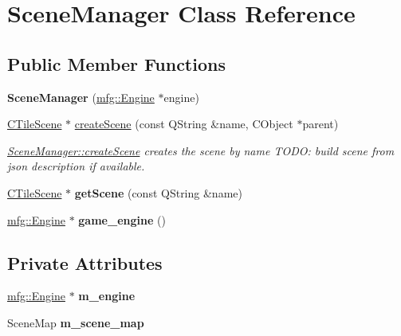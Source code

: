 \hypertarget{class_scene_manager}{}\section{Scene\+Manager Class Reference}
\label{class_scene_manager}
\subsection*{Public Member Functions}
\begin{DoxyCompactItemize}
\item 
\mbox{\label{class_scene_manager_a017968ad7fea883b37597ccd43ee8d21}} 
{\bfseries Scene\+Manager} (\hyperlink{classmfg_1_1_engine}{mfg\+::\+Engine} $\ast$engine)
\item 
\hyperlink{class_c_tile_scene}{C\+Tile\+Scene} $\ast$ \hyperlink{class_scene_manager_a0da379e114fea306e72feab6acc358ca}{create\+Scene} (const Q\+String \&name, C\+Object $\ast$parent)
\begin{DoxyCompactList}\small\item\em \hyperlink{class_scene_manager_a0da379e114fea306e72feab6acc358ca}{Scene\+Manager\+::create\+Scene} creates the scene by name T\+O\+DO\+: build scene from json description if available. \end{DoxyCompactList}\item 
\mbox{\label{class_scene_manager_af55193e1b17764e710b73e92e1ec1ab3}} 
\hyperlink{class_c_tile_scene}{C\+Tile\+Scene} $\ast$ {\bfseries get\+Scene} (const Q\+String \&name)
\item 
\mbox{\label{class_scene_manager_a249162f1c24a0960e354a67cf9ed039d}} 
\hyperlink{classmfg_1_1_engine}{mfg\+::\+Engine} $\ast$ {\bfseries game\+\_\+engine} ()
\end{DoxyCompactItemize}
\subsection*{Private Attributes}
\begin{DoxyCompactItemize}
\item 
\mbox{\label{class_scene_manager_a487426cfd98ef3b57a7b0192d490b4ae}} 
\hyperlink{classmfg_1_1_engine}{mfg\+::\+Engine} $\ast$ {\bfseries m\+\_\+engine}
\item 
\mbox{\label{class_scene_manager_a84a59de256b2d0c2574d77c62b0f4ff3}} 
Scene\+Map {\bfseries m\+\_\+scene\+\_\+map}
\end{DoxyCompactItemize}



